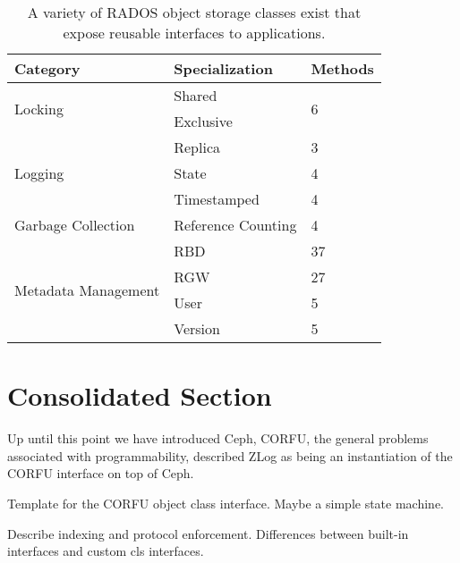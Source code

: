 \documentclass[10pt,twocolumn]{article}
\begin{document}
\begin{table}
\begin{tabular}{|l|l|l|}
\hline
Category & Specialization & Methods \\ \hline
\multirow{2}{*}{Locking} & Shared & \multirow{2}{*}{6} \\
                         & Exclusive & \\ \hline
\multirow{3}{*}{Logging} & Replica & 3 \\
                         & State & 4 \\
                         & Timestamped & 4 \\ \hline
Garbage Collection & Reference Counting & 4 \\ \hline
\multirow{4}{*}{Metadata Management} & RBD & 37 \\
 & RGW & 27 \\
 & User & 5 \\
 & Version & 5 \\ \hline
\end{tabular}
\caption{A variety of RADOS object storage classes exist that expose reusable interfaces to applications.}
\label{tab:objclasses}
\end{table}

\section{Consolidated Section}

Up until this point we have introduced Ceph, CORFU, the general problems
associated with programmability, described ZLog as being an instantiation of
the CORFU interface on top of Ceph.

Template for the CORFU object class interface. Maybe a simple state machine.

Describe indexing and protocol enforcement.
Differences between built-in interfaces and custom cls interfaces.
\end{document}

